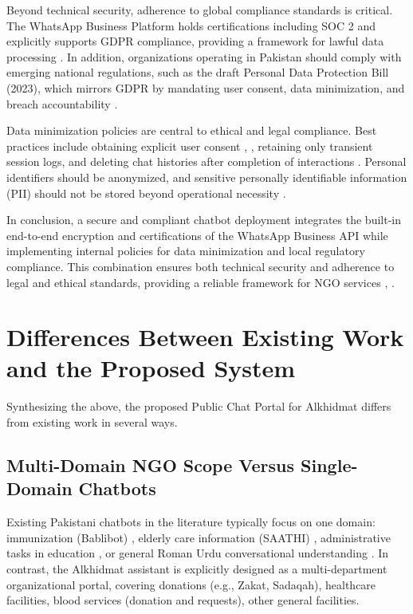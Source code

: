 Beyond technical security, adherence to global compliance standards is critical. The WhatsApp Business Platform holds certifications including SOC 2 and explicitly supports GDPR compliance, providing a framework for lawful data processing \cite{whatsapp2024trust}. In addition, organizations operating in Pakistan should comply with emerging national regulations, such as the draft Personal Data Protection Bill (2023), which mirrors GDPR by mandating user consent, data minimization, and breach accountability \cite{chambers2025pakistan}.  

Data minimization policies are central to ethical and legal compliance. Best practices include obtaining explicit user consent \cite{whatsapp2024trust}, \cite{chambers2025pakistan}, retaining only transient session logs, and deleting chat histories after completion of interactions \cite{whatsapp2024trust}. Personal identifiers should be anonymized, and sensitive personally identifiable information (PII) should not be stored beyond operational necessity \cite{chambers2025pakistan}.  

In conclusion, a secure and compliant chatbot deployment integrates the built-in end-to-end encryption and certifications of the WhatsApp Business API while implementing internal policies for data minimization and local regulatory compliance. This combination ensures both technical security and adherence to legal and ethical standards, providing a reliable framework for NGO services \cite{whatsapp2024trust}, \cite{chambers2025pakistan}.

\section{Differences Between Existing Work and the Proposed System}
Synthesizing the above, the proposed Public Chat Portal for Alkhidmat differs from existing work in several ways.

\subsection{Multi-Domain NGO Scope Versus Single-Domain Chatbots}
Existing Pakistani chatbots in the literature typically focus on one domain: immunization (Bablibot) \cite{munir2021bablibot,siddiqi2024bablibot}, elderly care information (SAATHI) \cite{kumar2022saathi}, administrative tasks in education \cite{maqbool2025adminbot}, or general Roman Urdu conversational understanding \cite{hakeem2025romanurdu}. In contrast, the Alkhidmat assistant is explicitly designed as a multi-department organizational portal, covering donations (e.g., Zakat, Sadaqah), healthcare facilities, blood services (donation and requests), other general facilities.

